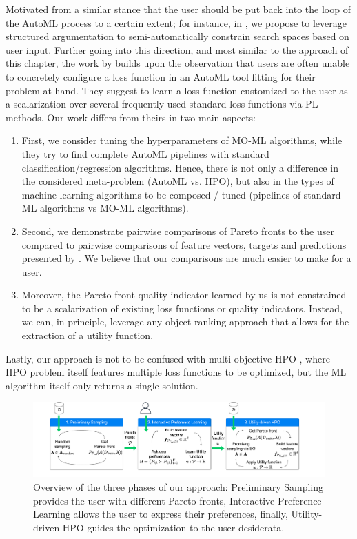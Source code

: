 Motivated from a similar stance that the user should be put back into the loop of the AutoML process to a certain extent; for instance, in , we propose to leverage structured argumentation to semi-automatically constrain search spaces based on user input. Further going into this direction, and most similar to the approach of this chapter, the work by \citet{kulbach-ecai20a} builds upon the observation that users are often unable to concretely configure a loss function in an AutoML tool fitting for their problem at hand. They suggest to learn a loss function customized to the user as a scalarization over several frequently used standard loss functions via PL methods. Our work differs from theirs in two main aspects: 
\begin{enumerate}
    \item First, we consider tuning the hyperparameters of MO-ML algorithms, while they try to find complete AutoML pipelines with standard classification/regression algorithms. Hence, there is not only a difference in the considered meta-problem (AutoML vs. HPO), but also in the types of machine learning algorithms to be composed / tuned (pipelines of standard ML algorithms vs MO-ML algorithms).
    \item Second, we demonstrate pairwise comparisons of Pareto fronts to the user compared to pairwise comparisons of feature vectors, targets and predictions presented by \citet{kulbach-ecai20a}. We believe that our comparisons are much easier to make for a user.
    \item Moreover, the Pareto front quality indicator learned by us is not constrained to be a scalarization of existing loss functions or quality indicators. Instead, we can, in principle, leverage any object ranking approach that allows for the extraction of a utility function.
\end{enumerate}

Lastly, our approach is not to be confused with multi-objective HPO \cite{moraleshernandez-arxiv21a}, where HPO problem itself features multiple loss functions to be optimized, but the ML algorithm itself only returns a single solution.

\begin{figure}[!ht]
\centering
\includegraphics[width=1\columnwidth]{chapters/human-centric/moo/img/method.pdf} 
\caption{Overview of the three phases of our approach: Preliminary Sampling provides the user with different Pareto fronts, Interactive Preference Learning allows the user to express their preferences, finally, Utility-driven HPO guides the optimization to the user desiderata.}
\label{moo-fig:method}
\end{figure}

